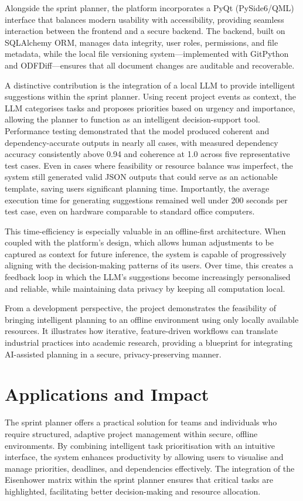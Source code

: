 \documentclass{report}
\begin{document}
Alongside the sprint planner, the platform incorporates a PyQt (PySide6/QML) interface that balances modern usability with accessibility, providing seamless interaction between the frontend and a secure backend. 
The backend, built on SQLAlchemy ORM, manages data integrity, user roles, permissions, and file metadata, while the local file versioning system—implemented with GitPython and ODFDiff—ensures that all document changes are auditable and recoverable.

A distinctive contribution is the integration of a local LLM to provide intelligent suggestions within the sprint planner. 
Using recent project events as context, the LLM categorises tasks and proposes priorities based on urgency and importance, allowing the planner to function as an intelligent decision-support tool. 
Performance testing demonstrated that the model produced coherent and dependency-accurate outputs in nearly all cases, with measured dependency accuracy consistently above 0.94 and coherence at 1.0 across five representative test cases. 
Even in cases where feasibility or resource balance was imperfect, the system still generated valid JSON outputs that could serve as an actionable template, saving users significant planning time. 
Importantly, the average execution time for generating suggestions remained well under 200 seconds per test case, even on hardware comparable to standard office computers.

This time-efficiency is especially valuable in an offline-first architecture. 
When coupled with the platform’s design, which allows human adjustments to be captured as context for future inference, the system is capable of progressively aligning with the decision-making patterns of its users. 
Over time, this creates a feedback loop in which the LLM’s suggestions become increasingly personalised and reliable, while maintaining data privacy by keeping all computation local.

From a development perspective, the project demonstrates the feasibility of bringing intelligent planning to an offline environment using only locally available resources. 
It illustrates how iterative, feature-driven workflows can translate industrial practices into academic research, providing a blueprint for integrating AI-assisted planning in a secure, privacy-preserving manner.

\section{Applications and Impact}
The sprint planner offers a practical solution for teams and individuals who require structured, adaptive project management within secure, offline environments. 
By combining intelligent task prioritisation with an intuitive interface, the system enhances productivity by allowing users to visualise and manage priorities, deadlines, and dependencies effectively. 
The integration of the Eisenhower matrix within the sprint planner ensures that critical tasks are highlighted, facilitating better decision-making and resource allocation. 
\end{document}
